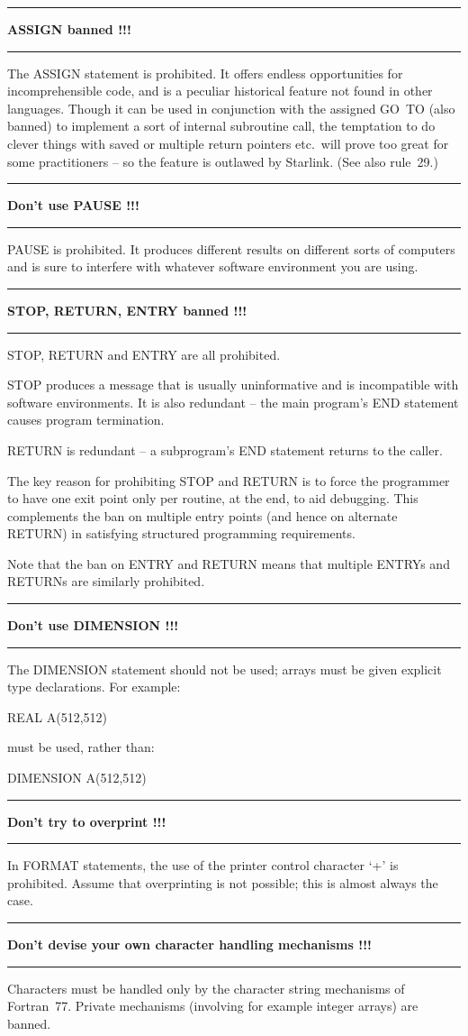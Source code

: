 \documentclass[twoside,11pt,nolof,noabs]{starlink}
\newcounter{sruleno}
\providecommand{\srule}[1]{
    \addtocounter{sruleno}{1}
    \goodbreak
    \rule{\textwidth}{0.3mm}
    \textbf{#1} \scpushright{ \textbf{\thesruleno}}
    \rule{\textwidth}{0.1mm}
}
\renewcommand{\_}{{\tt\char'137}}
\begin{document}
\srule{ASSIGN banned !!!}
The ASSIGN statement is prohibited.  It offers endless opportunities
for incomprehensible code, and is a peculiar historical feature
not found in other languages.  Though it can be used in conjunction
with the assigned GO~TO (also banned) to implement a sort of
internal subroutine call, the temptation to do clever things
with saved or multiple return pointers etc.\ will prove too great
for some practitioners -- so the feature is outlawed by Starlink.  (See
also rule~29.)

\srule{Don't use PAUSE !!!}
PAUSE is prohibited.  It produces different results on different
sorts of computers and is sure to interfere with whatever
software environment you are using.

\srule{STOP, RETURN, ENTRY banned !!!}
STOP, RETURN and ENTRY are all prohibited.

STOP produces a message that is usually uninformative and is incompatible with
software environments.
It is also redundant -- the main program's END statement
causes program termination.

RETURN is redundant -- a subprogram's END statement returns to the caller.

The key reason for prohibiting STOP and RETURN is to force the programmer to
have one exit point only per routine, at the end, to aid debugging.
This complements the ban on multiple entry points (and hence on alternate
RETURN) in satisfying structured programming requirements.

Note that the ban on ENTRY and RETURN means that multiple ENTRYs
and RETURNs are similarly prohibited.

\srule{Don't use DIMENSION !!!}
The DIMENSION statement should not be used; arrays must be given explicit type
declarations.
For example:
\begin{terminalv}
    REAL A(512,512)
\end{terminalv}
must be used, rather than:
\begin{terminalv}
    DIMENSION A(512,512)
\end{terminalv}

\srule{Don't try to overprint !!!}
In FORMAT statements,
the use of the printer control character `+' is prohibited.
Assume that overprinting is not possible;
this is almost always the case.

\srule{Don't devise your own character handling mechanisms !!!}
Characters must be handled only by the character string mechanisms of
Fortran~77.  Private mechanisms (involving for example integer arrays) are
banned.
\end{document}
